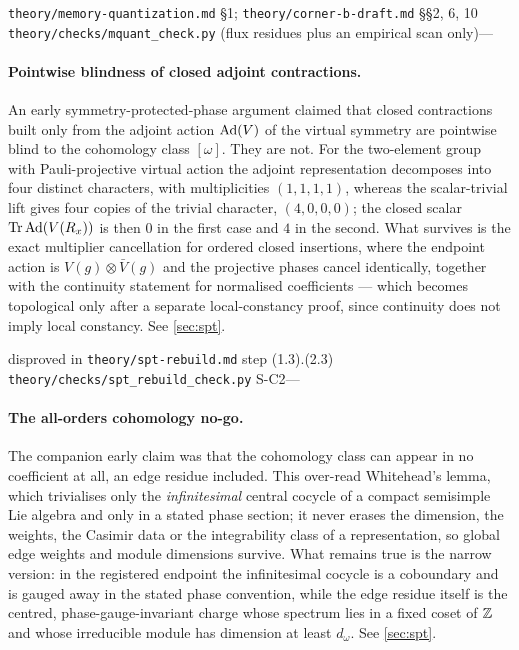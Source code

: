 %
{\texttt{theory/memory-quantization.md} §1; \texttt{theory/corner-b-draft.md} §§2, 6, 10}%
{\texttt{theory/checks/mquant\_check.py} (flux residues plus an empirical scan only)}{---}

\paragraph{Pointwise blindness of closed adjoint contractions.}
\statusRefuted{} An early symmetry-protected-phase argument claimed that
closed contractions built only from the adjoint action $\operatorname{Ad}(V)$ of the virtual
symmetry are pointwise blind to the cohomology class $[\omega]$. They are not.
For the two-element group with Pauli-projective virtual action the adjoint
representation decomposes into four distinct characters, with multiplicities
$(1,1,1,1)$, whereas the scalar-trivial lift gives four copies of the trivial
character, $(4,0,0,0)$; the closed scalar $\operatorname{Tr}\operatorname{Ad}(V(R_x))$ is
then $0$ in the first case and $4$ in the second. What survives is the exact
multiplier cancellation for ordered closed insertions, where the endpoint
action is $V(g) \otimes \bar V(g)$ and the projective phases cancel identically,
together with the continuity statement for normalised coefficients — which
becomes topological only after a separate local-constancy proof, since
continuity does not imply local constancy. See \cref{sec:spt}.

%
{disproved in \texttt{theory/spt-rebuild.md} step (1.3).(2.3)}%
{\texttt{theory/checks/spt\_rebuild\_check.py} S-C2}{---}

\paragraph{The all-orders cohomology no-go.} \statusRefuted{} The companion
early claim was that the cohomology class can appear in no coefficient at all,
an edge residue included. This over-read Whitehead's lemma, which trivialises
only the \emph{infinitesimal} central cocycle of a compact semisimple Lie
algebra and only in a stated phase section; it never erases the dimension, the
weights, the Casimir data or the integrability class of a representation, so
global edge weights and module dimensions survive. What remains true is the
narrow version: in the registered endpoint the infinitesimal cocycle is a
coboundary and is gauged away in the stated phase convention, while the edge
residue itself is the centred, phase-gauge-invariant charge whose spectrum
lies in a fixed coset of $\mathbb{Z}$ and whose irreducible module has dimension at
least $d_\omega$. See \cref{sec:spt}.

